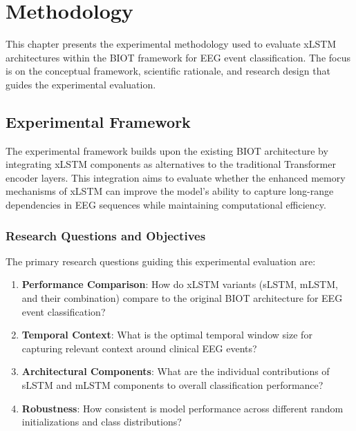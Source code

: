 \cleardoubleoddpage%
\chapter{Methodology}
\label{sec:methodology}

This chapter presents the experimental methodology used to evaluate \ac{xLSTM} architectures within the \ac{BIOT} framework for \ac{EEG} event classification. The focus is on the conceptual framework, scientific rationale, and research design that guides the experimental evaluation.

\section{Experimental Framework}
\label{sec:experimental_framework}

The experimental framework builds upon the existing \ac{BIOT} architecture by integrating \ac{xLSTM} components as alternatives to the traditional Transformer encoder layers. This integration aims to evaluate whether the enhanced memory mechanisms of \ac{xLSTM} can improve the model's ability to capture long-range dependencies in \ac{EEG} sequences while maintaining computational efficiency.

\subsection{Research Questions and Objectives}
\label{sec:research_questions}

The primary research questions guiding this experimental evaluation are:

\begin{enumerate}
    \item \textbf{Performance Comparison}: How do \ac{xLSTM} variants (\ac{sLSTM}, \ac{mLSTM}, and their combination) compare to the original \ac{BIOT} architecture for \ac{EEG} event classification?
    
    \item \textbf{Temporal Context}: What is the optimal temporal window size for capturing relevant context around clinical \ac{EEG} events?
    
    \item \textbf{Architectural Components}: What are the individual contributions of \ac{sLSTM} and \ac{mLSTM} components to overall classification performance?
    
    \item \textbf{Robustness}: How consistent is model performance across different random initializations and class distributions?
\end{enumerate}

